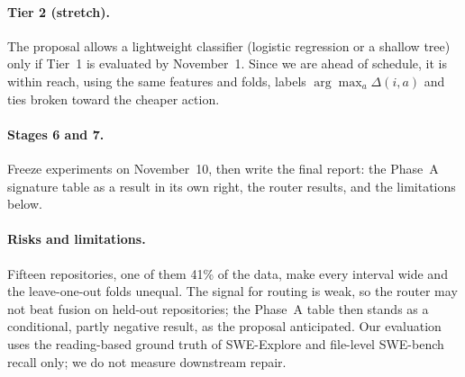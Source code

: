 \documentclass[11pt]{article}
\begin{document}
\paragraph{Tier 2 (stretch).} The proposal allows a lightweight classifier
(logistic regression or a shallow tree) only if Tier~1 is evaluated by
November~1. Since we are ahead of schedule, it is within reach, using the same features
and folds, labels $\arg\max_a \Delta(i,a)$ and ties broken toward the
cheaper action.

\paragraph{Stages 6 and 7.} Freeze experiments on November~10, then write the
final report: the Phase~A signature table as a result in its own right, the
router results, and the limitations below.

\paragraph{Risks and limitations.} Fifteen repositories, one of them 41\% of
the data, make every interval wide and the leave-one-out folds unequal. The
signal for routing is weak, so the router may not beat fusion on held-out
repositories; the Phase~A table then stands as a conditional, partly negative
result, as the proposal anticipated. Our evaluation uses the reading-based
ground truth of SWE-Explore and file-level SWE-bench recall only; we do not
measure downstream repair.


\end{document}
